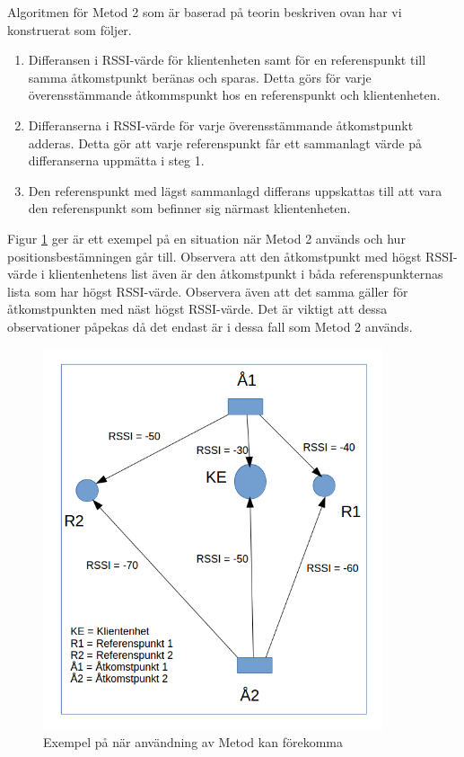 \documentclass[swedish, a4paper,12pt]{article}
\begin{document}
Algoritmen för Metod 2 som är baserad på teorin beskriven ovan har vi konstruerat som följer.

\begin{enumerate}
  \item Differansen i RSSI-värde för klientenheten samt för en referenspunkt till samma åtkomstpunkt beränas och sparas. Detta görs för varje överensstämmande åtkommspunkt hos en referenspunkt och klientenheten.
  \item Differanserna i RSSI-värde för varje överensstämmande åtkomstpunkt adderas. Detta gör att varje referenspunkt får ett sammanlagt värde på differanserna uppmätta i steg 1.
  \item Den referenspunkt med lägst sammanlagd differans uppskattas till att vara den referenspunkt som befinner sig närmast klientenheten.
\end{enumerate}

Figur \ref{fig:MET2} ger är ett exempel på en situation när Metod 2 används och hur positionsbestämningen går till.
Observera att den åtkomstpunkt med högst RSSI-värde i klientenhetens list även är den åtkomstpunkt i båda referenspunkternas lista som har högst RSSI-värde.
Observera även att det samma gäller för åtkomstpunkten med näst högst RSSI-värde.
Det är viktigt att dessa observationer påpekas då det endast är i dessa fall som Metod 2 används.

\begin{figure}[H]
  \centering
  \includegraphics[width=10cm]{media/MET2.png}
  \caption{Exempel på när användning av Metod kan förekomma}
  \label{fig:MET2}
\end{figure}
\end{document}

